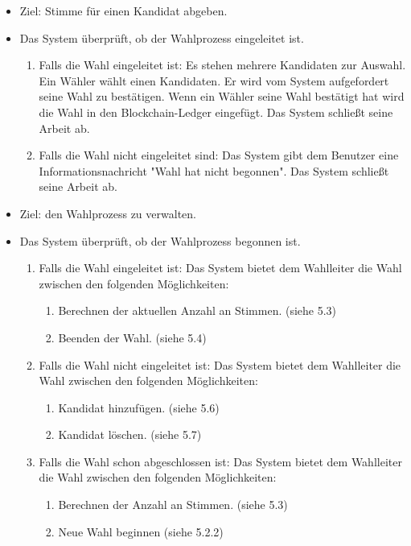\documentclass[parskip=full,11pt,twoside]{scrartcl}
\begin{document}
\begin{itemize}
	\item Ziel: Stimme für einen Kandidat abgeben.
	\item Das System überprüft, ob der Wahlprozess eingeleitet ist.  
	\begin{enumerate}
		\item Falls die Wahl eingeleitet ist: Es stehen mehrere Kandidaten zur Auswahl. Ein Wähler wählt einen Kandidaten. Er wird vom System aufgefordert seine Wahl zu bestätigen. Wenn ein Wähler seine Wahl bestätigt hat wird die Wahl in den Blockchain-Ledger eingefügt. Das System schließt seine Arbeit ab.
		\item Falls die Wahl nicht eingeleitet sind: Das System gibt dem Benutzer eine Informationsnachricht "Wahl hat nicht begonnen". Das System schließt seine Arbeit ab.
	\end{enumerate}
\end{itemize}

\begin{itemize}
	\item Ziel: den Wahlprozess zu verwalten.
	\item Das System überprüft, ob der Wahlprozess begonnen ist.   
	\begin{enumerate}
		\item Falls die Wahl eingeleitet ist: Das System bietet dem Wahlleiter die Wahl zwischen den folgenden Möglichkeiten:
		\begin{enumerate}
			\item Berechnen der aktuellen Anzahl an Stimmen. (siehe 5.3)
			\item Beenden der Wahl. (siehe 5.4)
		\end{enumerate}
		\item Falls die Wahl nicht eingeleitet ist: Das System bietet dem Wahlleiter die Wahl zwischen den folgenden Möglichkeiten:
		\begin{enumerate}
			\item Kandidat hinzufügen. (siehe 5.6)
			\item Kandidat löschen. (siehe 5.7)
		\end{enumerate}
		\item Falls die Wahl schon abgeschlossen ist: Das System bietet dem Wahlleiter die Wahl zwischen den folgenden Möglichkeiten:
		\begin{enumerate}
			\item Berechnen der Anzahl an Stimmen. (siehe 5.3)
			\item Neue Wahl beginnen (siehe 5.2.2)
		\end{enumerate}
	\end{enumerate}
\end{itemize}
\end{document}
